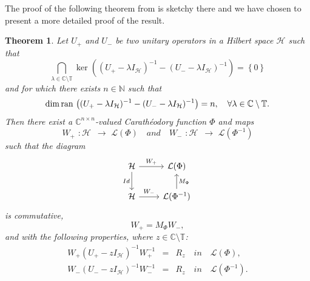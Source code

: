\documentclass[12pt]{amsart}
\newtheorem{thm}{Theorem}[section]
\theoremstyle{definition}
\theoremstyle{remark}
\numberwithin{equation}{section}
\begin{document}
The proof of the following theorem from \cite{MR1638044} is sketchy there and we have chosen to present a more detailed proof of the result.
\begin{thm}
  Let $U_+$ and  $U_-$ be two unitary operators in a Hilbert space $\mathcal H$ such that
  \begin{equation}
\label{ze-inter}
    \bigcap_{\lambda\in\mathbb C\setminus\mathbb T}\ker\left((U_+-\lambda I_{\mathcal H})^{-1}-(U_--\lambda I_{\mathcal H})^{-1}\right)=\left\{0\right\}
  \end{equation}
  and for which there exists $n\in\mathbb N$ such that
  \begin{equation}
    \label{rtg}
    {\rm dim}\,{\rm ran}\,\left((U_+-\lambda I_{\mathcal H})^{-1}-(U_--\lambda I_{\mathcal H})^{-1}\right)=n,\quad\forall \lambda\in\mathbb C\setminus\mathbb T.
  \end{equation}
 Then there exist a $\mathbb C^{n\times n}$-valued Carath\'eodory function $\Phi$ and maps
  \[
    W_+\,\,:\mathcal H\,\,\,\longrightarrow\,\,\mathcal L(\Phi)\quad and\quad
        W_-\,\,:\mathcal H\,\,\,\longrightarrow\,\,\mathcal L(\Phi^{-1})
      \]
      such that the diagram
\[
\begin{tikzcd}
\mathcal H \arrow[r, "W_+"] \arrow[d, "Id"'] & \mathcal L(\Phi) \\
\mathcal H \arrow[r, "W_-"]                  & \mathcal L(\Phi^{-1})\arrow[u,"M_{\Phi}" ']
\end{tikzcd}
\]
is commutative,
  \begin{equation}
    \label{comm}
W_+=M_\Phi W_-,
\end{equation}
and with the following properties, where $z\in\mathbb C\setminus\mathbb T$:
\begin{eqnarray}
  \label{w12}
  W_+(U_+-zI_{\mathcal H})^{-1}W_+^{-1}&=&R_z\quad {in}\quad\mathcal L(\Phi),\\
  W_-(U_--zI_{\mathcal H})^{-1}W_-^{-1}&=&R_z\quad {in}\quad\mathcal L(\Phi^{-1}).
\label{w22}
\end{eqnarray}
\end{thm}
\end{document}
